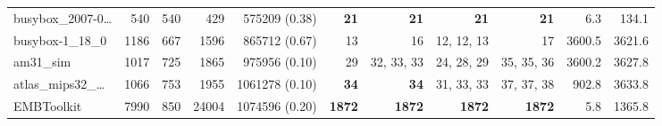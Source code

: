 \begin{table*}
\begin{tiny}
{\begin{tabular}{lrrrrrrrrrr}
busybox\_2007-0\ldots & \num[text-series-to-math=true]{540} & \num[text-series-to-math=true]{540} & \num[text-series-to-math=true]{429} & \num[text-series-to-math=true]{575209} (\num[text-series-to-math=true]{0.38}) & \textbf{\num[text-series-to-math=true]{21}} & \textbf{\num[text-series-to-math=true]{21}} & \textbf{\num[text-series-to-math=true]{21}} & \textbf{\num[text-series-to-math=true]{21}} & 6.3 & 134.1\\
busybox-1\_18\_0 & \num[text-series-to-math=true]{1186} & \num[text-series-to-math=true]{667} & \num[text-series-to-math=true]{1596} & \num[text-series-to-math=true]{865712} (\num[text-series-to-math=true]{0.67}) & \num[text-series-to-math=true]{13} & \num[text-series-to-math=true]{16} & \num[text-series-to-math=true]{12}, \num[text-series-to-math=true]{12}, \num[text-series-to-math=true]{13} & \num[text-series-to-math=true]{17} & 3600.5 & 3621.6\\
am31\_sim & \num[text-series-to-math=true]{1017} & \num[text-series-to-math=true]{725} & \num[text-series-to-math=true]{1865} & \num[text-series-to-math=true]{975956} (\num[text-series-to-math=true]{0.10}) & \num[text-series-to-math=true]{29} & \num[text-series-to-math=true]{32}, \num[text-series-to-math=true]{33}, \num[text-series-to-math=true]{33} & \num[text-series-to-math=true]{24}, \num[text-series-to-math=true]{28}, \num[text-series-to-math=true]{29} & \num[text-series-to-math=true]{35}, \num[text-series-to-math=true]{35}, \num[text-series-to-math=true]{36} & 3600.2 & 3627.8\\
atlas\_mips32\_\ldots & \num[text-series-to-math=true]{1066} & \num[text-series-to-math=true]{753} & \num[text-series-to-math=true]{1955} & \num[text-series-to-math=true]{1061278} (\num[text-series-to-math=true]{0.10}) & \textbf{\num[text-series-to-math=true]{34}} & \textbf{\num[text-series-to-math=true]{34}} & \num[text-series-to-math=true]{31}, \num[text-series-to-math=true]{33}, \num[text-series-to-math=true]{33} & \num[text-series-to-math=true]{37}, \num[text-series-to-math=true]{37}, \num[text-series-to-math=true]{38} & 902.8 & 3633.8\\
EMBToolkit & \num[text-series-to-math=true]{7990} & \num[text-series-to-math=true]{850} & \num[text-series-to-math=true]{24004} & \num[text-series-to-math=true]{1074596} (\num[text-series-to-math=true]{0.20}) & \textbf{\num[text-series-to-math=true]{1872}} & \textbf{\num[text-series-to-math=true]{1872}} & \textbf{\num[text-series-to-math=true]{1872}} & \textbf{\num[text-series-to-math=true]{1872}} & 5.8 & 1365.8\\

\end{tabular}}
\end{tiny}
\end{table*}
